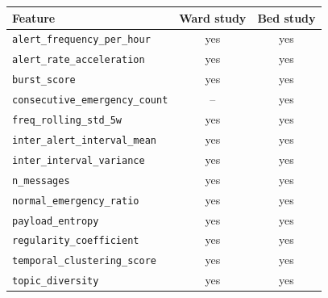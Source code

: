 \begin{tabular}{l c c}
\toprule
Feature & Ward study & Bed study \\
\midrule
\texttt{alert\_frequency\_per\_hour} & yes & yes \\
\texttt{alert\_rate\_acceleration} & yes & yes \\
\texttt{burst\_score} & yes & yes \\
\texttt{consecutive\_emergency\_count} & -- & yes \\
\texttt{freq\_rolling\_std\_5w} & yes & yes \\
\texttt{inter\_alert\_interval\_mean} & yes & yes \\
\texttt{inter\_interval\_variance} & yes & yes \\
\texttt{n\_messages} & yes & yes \\
\texttt{normal\_emergency\_ratio} & yes & yes \\
\texttt{payload\_entropy} & yes & yes \\
\texttt{regularity\_coefficient} & yes & yes \\
\texttt{temporal\_clustering\_score} & yes & yes \\
\texttt{topic\_diversity} & yes & yes \\
\bottomrule
\end{tabular}
